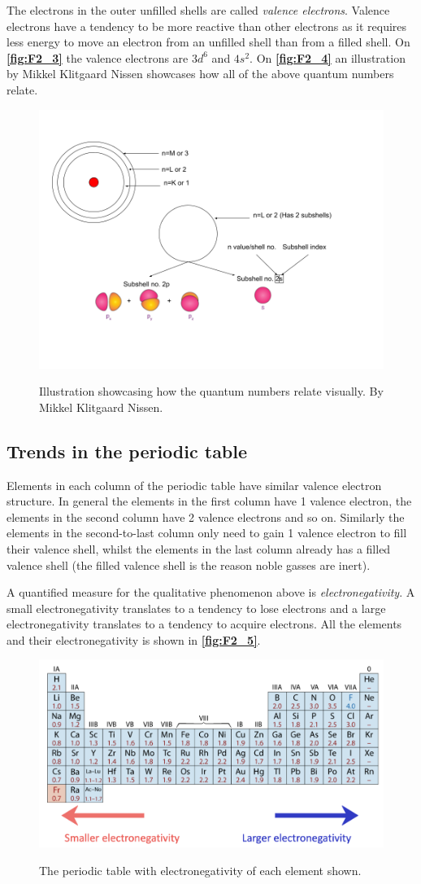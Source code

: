 The electrons in the outer unfilled shells are called \textit{valence electrons}. Valence electrons have a tendency to be more reactive than other electrons as it requires less energy to move an electron from an unfilled shell than from a filled shell. On \textbf{\autoref{fig:F2_3}} the valence electrons are $3d^6$ and $4s^2$. On \textbf{\autoref{fig:F2_4}} an illustration by Mikkel Klitgaard Nissen showcases how all of the above quantum numbers relate.
\begin{figure} [ht]
  \centering
  \caption{Illustration showcasing how the quantum numbers relate visually. By Mikkel Klitgaard Nissen.}
  \includegraphics[width=0.55\linewidth]{./figures/F2_4.png}
  \label{fig:F2_4}
\end{figure}


\subsection{Trends in the periodic table}
Elements in each column of the periodic table have similar valence electron structure. In general the elements in the first column have 1 valence electron, the elements in the second column have 2 valence electrons and so on. Similarly the elements in the second-to-last column only need to gain 1 valence electron to fill their valence shell, whilst the elements in the last column already has a filled valence shell (the filled valence shell is the reason noble gasses are inert).

A quantified measure for the qualitative phenomenon above is \textit{electronegativity}. A small electronegativity translates to a tendency to lose electrons and a large electronegativity translates to a tendency to acquire electrons. All the elements and their electronegativity is shown in \textbf{\autoref{fig:F2_5}}.
\begin{figure} [ht]
  \centering
  \caption{The periodic table with electronegativity of each element shown.}
  \includegraphics[width=0.8\linewidth]{./figures/F2_5.png}
  \label{fig:F2_5}
\end{figure}


